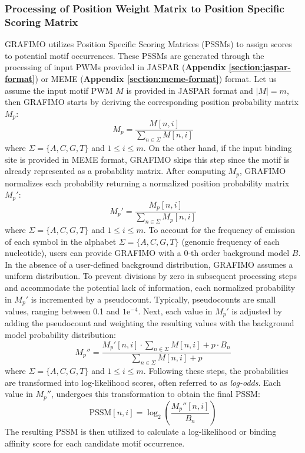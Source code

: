\documentclass[a4paper, titlepage, openright]{book}
\newcommand{\grafimo}{GRAFIMO\xspace}
\begin{document}
\subsubsection{Processing of Position Weight Matrix to Position Specific Scoring Matrix}
\grafimo utilizes Position Specific Scoring Matrices (PSSMs) to assign scores to potential motif occurrences. These PSSMs are generated through the processing of input PWMs provided in JASPAR (\textbf{Appendix \ref{section:jaspar-format}}) or MEME (\textbf{Appendix \ref{section:meme-format}}) format. Let us assume the input motif PWM $M$ is provided in JASPAR format and $|M| = m$, then \grafimo starts by deriving the corresponding position probability matrix $M_{p}$:
\[
    M_{p} = \frac{M[n,i]}{\sum_{n \in \Sigma}{M[n,i]}}
\]
where $\Sigma=\{A,C,G,T\}$ and $1 \leq i \leq m$. On the other hand, if the input binding site is provided in MEME format, \grafimo skips this step since the motif is already represented as a probability matrix. After computing $M_{p}$, \grafimo normalizes each probability returning a normalized position probability matrix $M_{p}'$:
\[
    M_{p}' = \frac{M_{p}[n,i]}{\sum_{n \in \Sigma}{M_{p}[n,i]}}
\]
where $\Sigma=\{A,C,G,T\}$ and $1 \leq i \leq m$. To account for the frequency of emission of each symbol in the alphabet $\Sigma=\{A,C,G,T\}$ (genomic frequency of each nucleotide), users can provide \grafimo with a 0-th order background model $B$. In the absence of a user-defined background distribution, \grafimo assumes a uniform distribution. To prevent divisions by zero in subsequent processing steps and accommodate the potential lack of information, each normalized probability in $M_{p}'$ is incremented by a pseudocount. Typically, pseudocounts are small values, ranging between 0.1 and $1\text{e}^{-4}$. Next, each value in $M_{p}'$ is adjusted by adding the pseudocount and weighting the resulting values with the background model probability distribution:
\[
    M_{p}'' = \frac{M_{p}'[n,i] \cdot \sum_{n \in \Sigma}{M[n,i] + p \cdot B_{n}}}{\sum_{n \in \Sigma}{M[n,i] + p}}
\]
where $\Sigma=\{A,C,G,T\}$ and $1 \leq i \leq m$. Following these steps, the probabilities are transformed into log-likelihood scores, often referred to as \emph{log-odds}. Each value in $M_{p}''$, undergoes this transformation to obtain the final PSSM:
\[
    \text{PSSM}[n,i] = \log_{2}{\left (\frac{M_{p}''[n,i]}{B_{n}} \right )}
\]
The resulting PSSM is then utilized to calculate a log-likelihood or binding affinity score for each candidate motif occurrence.

\end{document}
